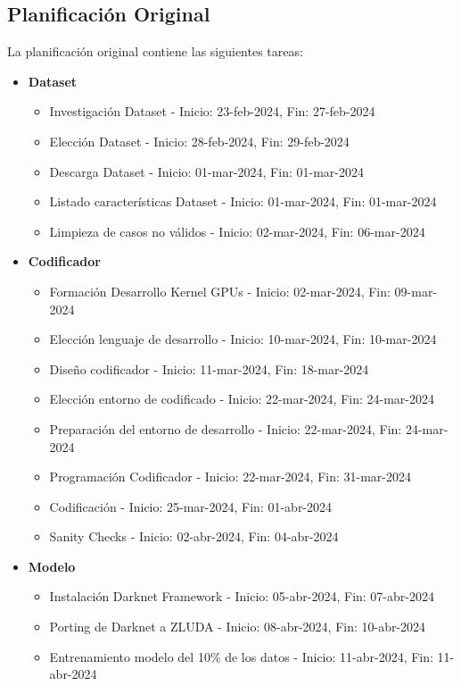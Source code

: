 \subsection{Planificación Original}
La planificación original contiene las siguientes tareas:
\begin{itemize}
    \item \textbf{Dataset}
    \begin{itemize}
        \item Investigación Dataset - Inicio: 23-feb-2024, Fin: 27-feb-2024
        \item Elección Dataset - Inicio: 28-feb-2024, Fin: 29-feb-2024
        \item Descarga Dataset - Inicio: 01-mar-2024, Fin: 01-mar-2024
        \item Listado características Dataset - Inicio: 01-mar-2024, Fin: 01-mar-2024
        \item Limpieza de casos no válidos - Inicio: 02-mar-2024, Fin: 06-mar-2024
    \end{itemize}
    \item \textbf{Codificador}
    \begin{itemize}
        \item Formación Desarrollo Kernel GPUs - Inicio: 02-mar-2024, Fin: 09-mar-2024
        \item Elección lenguaje de desarrollo - Inicio: 10-mar-2024, Fin: 10-mar-2024
        \item Diseño codificador - Inicio: 11-mar-2024, Fin: 18-mar-2024
        \item Elección entorno de codificado - Inicio: 22-mar-2024, Fin: 24-mar-2024
        \item Preparación del entorno de desarrollo - Inicio: 22-mar-2024, Fin: 24-mar-2024
        \item Programación Codificador - Inicio: 22-mar-2024, Fin: 31-mar-2024
        \item Codificación - Inicio: 25-mar-2024, Fin: 01-abr-2024
        \item Sanity Checks - Inicio: 02-abr-2024, Fin: 04-abr-2024
    \end{itemize}
    \item \textbf{Modelo}
    \begin{itemize}
        \item Instalación Darknet Framework - Inicio: 05-abr-2024, Fin: 07-abr-2024
        \item Porting de Darknet a ZLUDA - Inicio: 08-abr-2024, Fin: 10-abr-2024
        \item Entrenamiento modelo del 10\% de los datos - Inicio: 11-abr-2024, Fin: 11-abr-2024

\end{itemize}
\end{itemize}
